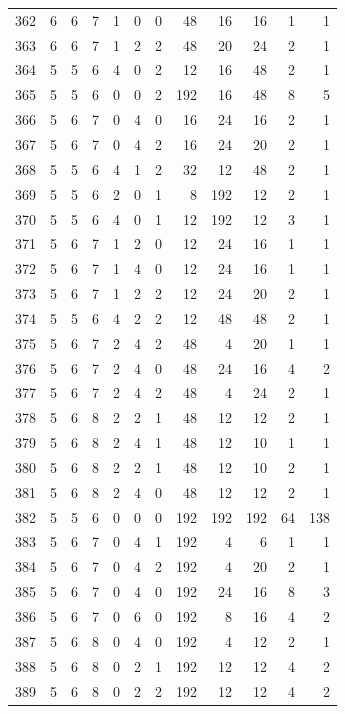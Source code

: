 \documentclass[11pt,a4paper]{article}
\begin{document}
\begin{longtable}{r|rrr|rrr|rrr|rr}
362 & 6 & 6 & 7 & 1 & 0 & 0 & 48 & 16 & 16 & 1 & 1\\
363 & 6 & 6 & 7 & 1 & 2 & 2 & 48 & 20 & 24 & 2 & 1\\
364 & 5 & 5 & 6 & 4 & 0 & 2 & 12 & 16 & 48 & 2 & 1\\
365 & 5 & 5 & 6 & 0 & 0 & 2 & 192 & 16 & 48 & 8 & 5\\
366 & 5 & 6 & 7 & 0 & 4 & 0 & 16 & 24 & 16 & 2 & 1\\
367 & 5 & 6 & 7 & 0 & 4 & 2 & 16 & 24 & 20 & 2 & 1\\
368 & 5 & 5 & 6 & 4 & 1 & 2 & 32 & 12 & 48 & 2 & 1\\
369 & 5 & 5 & 6 & 2 & 0 & 1 & 8 & 192 & 12 & 2 & 1\\
370 & 5 & 5 & 6 & 4 & 0 & 1 & 12 & 192 & 12 & 3 & 1\\
371 & 5 & 6 & 7 & 1 & 2 & 0 & 12 & 24 & 16 & 1 & 1\\
372 & 5 & 6 & 7 & 1 & 4 & 0 & 12 & 24 & 16 & 1 & 1\\
373 & 5 & 6 & 7 & 1 & 2 & 2 & 12 & 24 & 20 & 2 & 1\\
374 & 5 & 5 & 6 & 4 & 2 & 2 & 12 & 48 & 48 & 2 & 1\\
375 & 5 & 6 & 7 & 2 & 4 & 2 & 48 & 4 & 20 & 1 & 1\\
376 & 5 & 6 & 7 & 2 & 4 & 0 & 48 & 24 & 16 & 4 & 2\\
377 & 5 & 6 & 7 & 2 & 4 & 2 & 48 & 4 & 24 & 2 & 1\\
378 & 5 & 6 & 8 & 2 & 2 & 1 & 48 & 12 & 12 & 2 & 1\\
379 & 5 & 6 & 8 & 2 & 4 & 1 & 48 & 12 & 10 & 1 & 1\\
380 & 5 & 6 & 8 & 2 & 2 & 1 & 48 & 12 & 10 & 2 & 1\\
381 & 5 & 6 & 8 & 2 & 4 & 0 & 48 & 12 & 12 & 2 & 1\\
382 & 5 & 5 & 6 & 0 & 0 & 0 & 192 & 192 & 192 & 64 & 138\\
383 & 5 & 6 & 7 & 0 & 4 & 1 & 192 & 4 & 6 & 1 & 1\\
384 & 5 & 6 & 7 & 0 & 4 & 2 & 192 & 4 & 20 & 2 & 1\\
385 & 5 & 6 & 7 & 0 & 4 & 0 & 192 & 24 & 16 & 8 & 3\\
386 & 5 & 6 & 7 & 0 & 6 & 0 & 192 & 8 & 16 & 4 & 2\\
387 & 5 & 6 & 8 & 0 & 4 & 0 & 192 & 4 & 12 & 2 & 1\\
388 & 5 & 6 & 8 & 0 & 2 & 1 & 192 & 12 & 12 & 4 & 2\\
389 & 5 & 6 & 8 & 0 & 2 & 2 & 192 & 12 & 12 & 4 & 2\\

\end{longtable}
\end{document}
